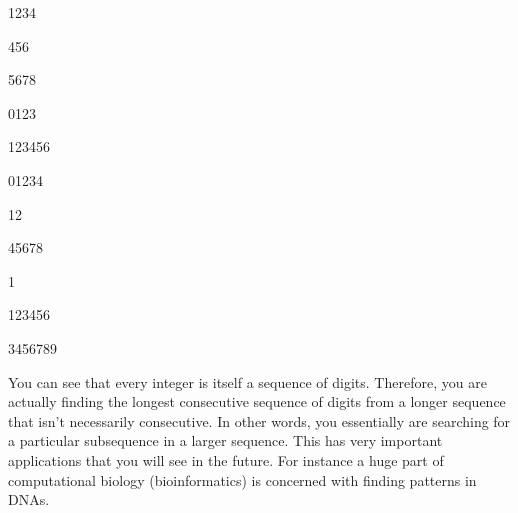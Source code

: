 \nextt
\begin{console}[commandchars=\\\{\}]
1234
\end{console}

\nextt
\begin{console}[commandchars=\\\{\}]
456
\end{console}

\nextt
\begin{console}[commandchars=\\\{\}]
5678
\end{console}

\nextt
\begin{console}[commandchars=\\\{\}]
0123
\end{console}

\nextt
\begin{console}[commandchars=\\\{\}]
123456
\end{console}

\nextt
\begin{console}[commandchars=\\\{\}]
01234
\end{console}

\nextt
\begin{console}[commandchars=\\\{\}]
12
\end{console}

\nextt
\begin{console}[commandchars=\\\{\}]
45678
\end{console}

\nextt
\begin{console}[commandchars=\\\{\}]
1
\end{console}

\nextt
\begin{console}[commandchars=\\\{\}]
123456
\end{console}

\nextt
\begin{console}[commandchars=\\\{\}]
3456789
\end{console}

You can see that every integer is itself a sequence of digits. Therefore, you
are actually finding the longest consecutive sequence of digits from a longer
sequence that isn't necessarily consecutive. In other words, you essentially
are searching for a particular subsequence in a larger sequence. This has very
important applications that you will see in the future.
For instance a huge part of computational biology (bioinformatics)
is concerned with finding patterns in DNAs.
